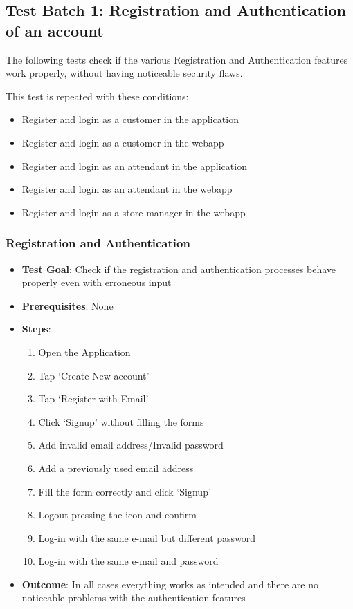 \subsection{Test Batch 1: Registration and Authentication of an account}
The following tests check if the various Registration and Authentication features work properly, without having noticeable security flaws.

This test is repeated with these conditions:
\begin{itemize}
    \item Register and login as a customer in the application
    \item Register and login as a customer in the webapp
    \item Register and login as an attendant in the application
    \item Register and login as an attendant in the webapp
    \item Register and login as a store manager in the webapp
\end{itemize}
\subsubsection{Registration and Authentication}
\begin{itemize}
    \item \textbf{Test Goal}: Check if the registration and authentication processes behave properly even with erroneous input
    \item \textbf{Prerequisites}: None
    \item \textbf{Steps}:
          \begin{enumerate}
              \item Open the Application
              \item Tap `Create New account'
              \item Tap `Register with Email'
              \item Click `Signup' without filling the forms
              \item Add invalid email address/Invalid password
              \item Add a previously used email address
              \item Fill the form correctly and click `Signup'
              \item Logout pressing the icon and confirm
              \item Log-in with the same e-mail but different password
              \item Log-in with the same e-mail and password
          \end{enumerate}
    \item \textbf{Outcome}: In all cases everything works as intended and there are no noticeable problems with the authentication features
\end{itemize}

